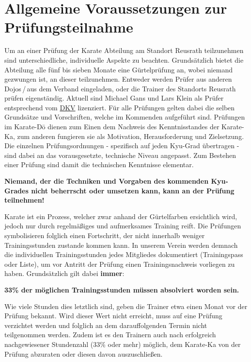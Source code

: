 	\section{Allgemeine Voraussetzungen zur Prüfungsteilnahme}
		Um an einer Prüfung der Karate Abteilung am Standort Reusrath teilzunehmen sind unterschiedliche, individuelle Aspekte zu beachten. Grundsätzlich bietet die Abteilung alle fünf bis sieben Monate eine Gürtelprüfung an, wobei niemand gezwungen ist, an dieser teilzunehmen. Entweder werden Prüfer aus anderen Dojos\,/\,aus dem Verband eingeladen, oder die Trainer des Standorts Reusrath prüfen eigenständig. Aktuell sind Michael Gans und Lars Klein als Prüfer entsprechend vom \href{https://www.karate.de/}{DKV} lizenziert. Für alle Prüfungen gelten dabei die selben Grundsätze und Vorschriften, welche im Kommenden aufgeführt sind.
	\vspace{4pt}\newline
		Prüfungen im Karate-D\={o} dienen zum Einen dem Nachweis des Kenntnisstandes der Karate-Ka, zum anderen fungieren sie als Motivation, Herausforderung und Zielsetzung. Die einzelnen Prüfungsordnungen - spezifisch auf jeden Kyu-Grad übertragen - sind dabei an das vorausgesetzte, technische Niveau angepasst. Zum Bestehen einer Prüfung sind damit die technischen Kenntnisse elementar.
		\begin{center}
			\textbf{Niemand, der die Techniken und Vorgaben des kommenden Kyu-Grades nicht beherrscht oder umsetzen kann, kann an der Prüfung teilnehmen!}
		\end{center}
		Karate ist ein Prozess, welcher zwar anhand der Gürtelfarben ersichtlich wird, jedoch nur durch regelmäßiges und aufmerksames Training reift. Die Prüfungen symbolisieren folglich einen Fortschritt, der nicht innerhalb weniger Trainingsstunden zustande kommen kann.
	\vspace{4pt}\newline
		In unserem Verein werden demnach die individuellen Trainingsstunden jedes Mitgliedes dokumentiert (Trainingspass oder Liste), um vor Antritt der Prüfung einen Trainingsnachweis vorliegen zu haben. Grundsätzlich gilt dabei \textbf{immer}:
		\begin{center}
			\textbf{33\% der möglichen Trainingsstunden müssen absolviert worden sein.}
		\end{center}
		Wie viele Stunden dies letztlich sind, geben die Trainer etwa einen Monat vor der Prüfung bekannt. Wird dieser Wert nicht erreicht, muss auf eine Prüfung verzichtet werden und folglich an dem darauffolgenden Termin nicht teilgenommen werden. Zudem ist es den Trainern auch nach erfolgreich nachgewiesener Stundenzahl (33\% oder mehr) möglich, dem Karate-Ka von der Prüfung abzuraten oder diesen davon auszuschließen.
